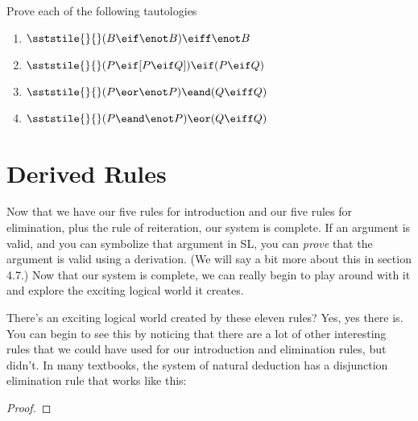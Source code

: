 \noindent\problempart
Prove each of the following tautologies
\begin{enumerate}[label=(\arabic*)]
\item $\sststile{}{} (B \eif \enot B) \eiff \enot B$


\item $\sststile{}{} (P \eif [P \eif Q]) \eif (P \eif Q)$ %

\item $\sststile{}{} (P \eor \enot P) \eand (Q \eiff Q) $ %

\item $\sststile{}{} (P \eand \enot P) \eor  (Q \eiff Q)$%

\end{enumerate}


\section{Derived Rules}
\setlength{\parindent}{1em}


Now that we have our five rules for introduction and our five rules for elimination, plus the rule of reiteration, our system is complete. If an argument is valid, and you can symbolize that argument in SL, you can \emph{prove} that the argument is valid using a derivation. (We will say a bit more about this in section 4.7.) Now that our system is complete, we can really begin to play around with it and explore the exciting  logical world it creates.

There's an exciting logical world created by these eleven rules? Yes, yes there is. You can begin to see this by noticing that there are a lot of other interesting rules that we could have used for our introduction and elimination rules, but didn't. In many textbooks, the system of natural deduction has a disjunction elimination rule that works like this:

\begin{proof}
	 
\end{proof}

